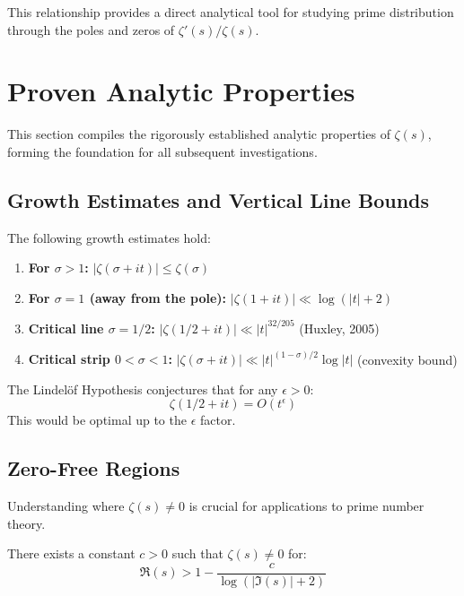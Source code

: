 This relationship provides a direct analytical tool for studying prime distribution through the poles and zeros of $\zeta'(s)/\zeta(s)$.

\section{Proven Analytic Properties}
\label{sec:analytic_properties}

This section compiles the rigorously established analytic properties of $\zeta(s)$, forming the foundation for all subsequent investigations.

\subsection{Growth Estimates and Vertical Line Bounds}

\begin{theorem}
\label{thm:growth_bounds}
The following growth estimates hold:
\begin{enumerate}[label=(\alph*)]
\item \textbf{For $\sigma > 1$:} $|\zeta(\sigma + it)| \leq \zeta(\sigma)$
\item \textbf{For $\sigma = 1$ (away from the pole):} $|\zeta(1 + it)| \ll \log(|t| + 2)$
\item \textbf{Critical line $\sigma = 1/2$:} $|\zeta(1/2 + it)| \ll |t|^{32/205}$ (Huxley, 2005)
\item \textbf{Critical strip $0 < \sigma < 1$:} $|\zeta(\sigma + it)| \ll |t|^{(1-\sigma)/2} \log |t|$ (convexity bound)
\end{enumerate}
\end{theorem}

\begin{openproblem}
The Lindelöf Hypothesis conjectures that for any $\epsilon > 0$:
\[
\zeta(1/2 + it) = O(t^{\epsilon})
\]
This would be optimal up to the $\epsilon$ factor.
\end{openproblem}

\subsection{Zero-Free Regions}

Understanding where $\zeta(s) \neq 0$ is crucial for applications to prime number theory.

\begin{theorem}
\label{thm:classical_zerofree}
There exists a constant $c > 0$ such that $\zeta(s) \neq 0$ for:
\begin{equation}
\Re(s) > 1 - \frac{c}{\log(|\Im(s)| + 2)}
\end{equation}
\end{theorem}

